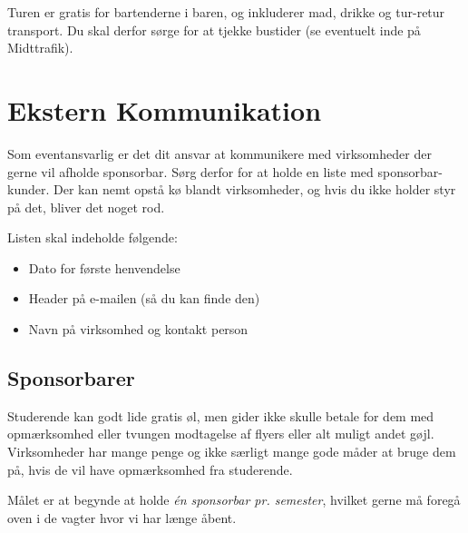 Turen er gratis for bartenderne i baren, og inkluderer mad, drikke og
tur-retur transport. Du skal derfor sørge for at tjekke bustider (se
eventuelt inde på Midttrafik).

\section{Ekstern Kommunikation}
\label{sec:ekst-komm}

Som eventansvarlig er det dit ansvar at kommunikere med virksomheder
der gerne vil afholde sponsorbar. Sørg derfor for at holde en liste
med sponsorbar-kunder. Der kan nemt opstå kø blandt virksomheder, og
hvis du ikke holder styr på det, bliver det noget rod.

Listen skal indeholde følgende:
\begin{itemize}
\item Dato for første henvendelse
\item Header på e-mailen (så du kan finde den)
\item Navn på virksomhed og kontakt person
\end{itemize}

\subsection{Sponsorbarer}
\label{sec:sponsorbarer}

Studerende kan godt lide gratis øl, men gider ikke skulle betale for
dem med opmærksomhed eller tvungen modtagelse af flyers eller alt
muligt andet gøjl. Virksomheder har mange penge og ikke særligt mange
gode måder at bruge dem på, hvis de vil have opmærksomhed fra
studerende.

Målet er at begynde at holde \emph{én sponsorbar pr. semester},
hvilket gerne må foregå oven i de vagter hvor vi har længe åbent.

